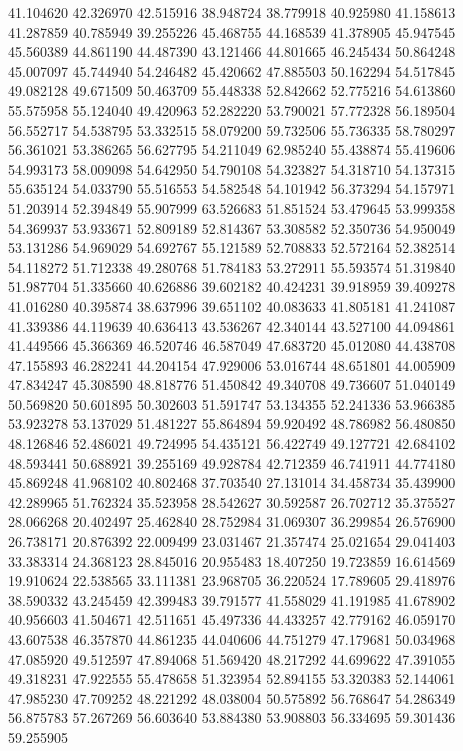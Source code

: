 41.104620
42.326970
42.515916
38.948724
38.779918
40.925980
41.158613
41.287859
40.785949
39.255226
45.468755
44.168539
41.378905
45.947545
45.560389
44.861190
44.487390
43.121466
44.801665
46.245434
50.864248
45.007097
45.744940
54.246482
45.420662
47.885503
50.162294
54.517845
49.082128
49.671509
50.463709
55.448338
52.842662
52.775216
54.613860
55.575958
55.124040
49.420963
52.282220
53.790021
57.772328
56.189504
56.552717
54.538795
53.332515
58.079200
59.732506
55.736335
58.780297
56.361021
53.386265
56.627795
54.211049
62.985240
55.438874
55.419606
54.993173
58.009098
54.642950
54.790108
54.323827
54.318710
54.137315
55.635124
54.033790
55.516553
54.582548
54.101942
56.373294
54.157971
51.203914
52.394849
55.907999
63.526683
51.851524
53.479645
53.999358
54.369937
53.933671
52.809189
52.814367
53.308582
52.350736
54.950049
53.131286
54.969029
54.692767
55.121589
52.708833
52.572164
52.382514
54.118272
51.712338
49.280768
51.784183
53.272911
55.593574
51.319840
51.987704
51.335660
40.626886
39.602182
40.424231
39.918959
39.409278
41.016280
40.395874
38.637996
39.651102
40.083633
41.805181
41.241087
41.339386
44.119639
40.636413
43.536267
42.340144
43.527100
44.094861
41.449566
45.366369
46.520746
46.587049
47.683720
45.012080
44.438708
47.155893
46.282241
44.204154
47.929006
53.016744
48.651801
44.005909
47.834247
45.308590
48.818776
51.450842
49.340708
49.736607
51.040149
50.569820
50.601895
50.302603
51.591747
53.134355
52.241336
53.966385
53.923278
53.137029
51.481227
55.864894
59.920492
48.786982
56.480850
48.126846
52.486021
49.724995
54.435121
56.422749
49.127721
42.684102
48.593441
50.688921
39.255169
49.928784
42.712359
46.741911
44.774180
45.869248
41.968102
40.802468
37.703540
27.131014
34.458734
35.439900
42.289965
51.762324
35.523958
28.542627
30.592587
26.702712
35.375527
28.066268
20.402497
25.462840
28.752984
31.069307
36.299854
26.576900
26.738171
20.876392
22.009499
23.031467
21.357474
25.021654
29.041403
33.383314
24.368123
28.845016
20.955483
18.407250
19.723859
16.614569
19.910624
22.538565
33.111381
23.968705
36.220524
17.789605
29.418976
38.590332
43.245459
42.399483
39.791577
41.558029
41.191985
41.678902
40.956603
41.504671
42.511651
45.497336
44.433257
42.779162
46.059170
43.607538
46.357870
44.861235
44.040606
44.751279
47.179681
50.034968
47.085920
49.512597
47.894068
51.569420
48.217292
44.699622
47.391055
49.318231
47.922555
55.478658
51.323954
52.894155
53.320383
52.144061
47.985230
47.709252
48.221292
48.038004
50.575892
56.768647
54.286349
56.875783
57.267269
56.603640
53.884380
53.908803
56.334695
59.301436
59.255905

